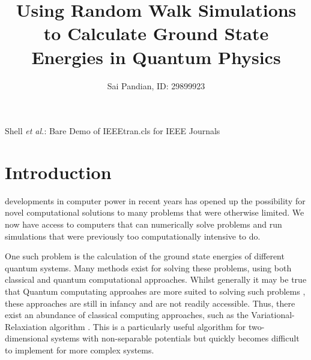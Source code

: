 \documentclass[journal]{IEEEtran}
\begin{document}
\title{Using Random Walk Simulations to Calculate Ground State Energies in
  Quantum Physics}

\author{Sai Pandian, ID: 29899923}%
        
{Shell \MakeLowercase{\textit{et al.}}: Bare Demo of IEEEtran.cls for IEEE Journals}

\maketitle

\begin{abstract}
\end{abstract}


\section{Introduction}
 developments in computer power in recent years has opened
up the possibility for novel computational solutions to many problems that were
otherwise limited. We now have access to computers that can numerically solve
problems and run simulations that were previously too computationally intensive
to do.

One such problem is the calculation of the ground state energies of different
quantum systems. Many methods exist for solving these problems, using both
classical and quantum computational approaches. Whilst generally it may be true
that Quantum computating approahes are more suited to solving such problems
\cite{Mazzola}, these approaches are still in infancy and are not readily
accessible. Thus, there exist an abundance of classical computing approaches,
such as the Variational-Relaxiation algorithm \cite{Schroeder2017}. This is a
particularly useful algorithm for two-dimensional systems with non-separable
potentials but quickly becomes difficult to implement for more complex systems.
\end{document}
